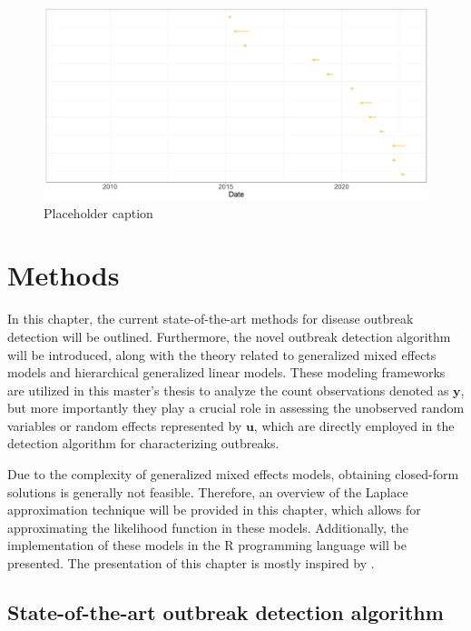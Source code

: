 \documentclass[a4paper,twoside,11pt]{report} %
\theoremstyle{definition}
\theoremstyle{definition}
\theoremstyle{definition}
\theoremstyle{definition}
\theoremstyle{remark}
\begin{document}
\begin{figure}[H]
\includegraphics[width=1\linewidth]{../figures/SALM_SSI_outbreaks} \caption{Placeholder caption}\label{fig:SALMSSIoutbreaks}
\end{figure}

\cleardoublepage

\chapter{Methods}

In this chapter, the current state-of-the-art methods for disease outbreak detection will be outlined. Furthermore, the novel outbreak detection algorithm will be introduced, along with the theory related to generalized mixed effects models and hierarchical generalized linear models. These modeling frameworks are utilized in this master's thesis to analyze the count observations denoted as \(\boldsymbol{y}\), but more importantly they play a crucial role in assessing the unobserved random variables or random effects represented by \(\boldsymbol{u}\), which are directly employed in the detection algorithm for characterizing outbreaks.

Due to the complexity of generalized mixed effects models, obtaining closed-form solutions is generally not feasible. Therefore, an overview of the Laplace approximation technique will be provided in this chapter, which allows for approximating the likelihood function in these models. Additionally, the implementation of these models in the R programming language will be presented. The presentation of this chapter is mostly inspired by \textcite{Madsen_2010}.

\section{State-of-the-art outbreak detection algorithm}\label{StateOfTheArt}
\end{document}
